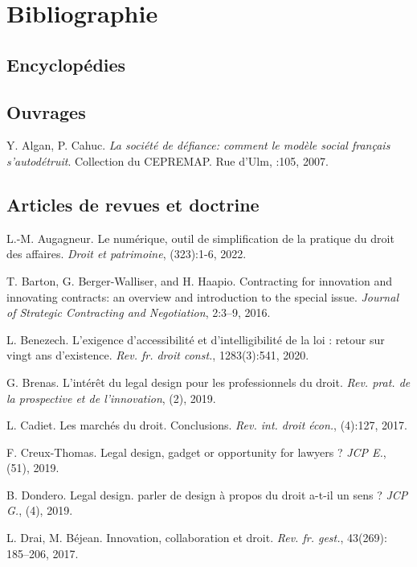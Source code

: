 \chapter*{Bibliographie}

\section*{Encyclopédies}
\section*{Ouvrages}
Y. Algan, P. Cahuc. \emph{La société de défiance: comment le modèle social français s’autodétruit}. Collection du CEPREMAP. Rue d’Ulm, :105, 2007.\par{}

\section*{Articles de revues et doctrine}

L.-M. Augagneur. Le numérique, outil de simplification de la pratique du droit des affaires. \emph{Droit et patrimoine}, (323):1-6, 2022.\par{}

T. Barton, G. Berger-Walliser, and H. Haapio. Contracting for innovation and innovating contracts: an overview and introduction to the special issue. \emph{Journal of Strategic Contracting and Negotiation}, 2:3–9, 2016.

L. Benezech. L’exigence d’accessibilité et d’intelligibilité de la loi : retour sur vingt ans d’existence. \emph{Rev. fr. droit const.}, 1283(3):541, 2020.\par{}

G. Brenas. L’intérêt du legal design pour les professionnels du droit. \emph{Rev. prat. de la prospective et de l’innovation}, (2), 2019.\par{}

L. Cadiet. Les marchés du droit. Conclusions. \emph{Rev. int. droit écon.}, (4):127, 2017.\par{}

F. Creux-Thomas. Legal design, gadget or opportunity for lawyers ? \emph{JCP E.}, (51), 2019.\par{}

B. Dondero. Legal design. parler de design à propos du droit a-t-il un sens ? \emph{JCP G.}, (4), 2019.\par{}

L. Drai, M. Béjean. Innovation, collaboration et droit. \emph{Rev. fr. gest.}, 43(269): 185–206, 2017.\par{}

